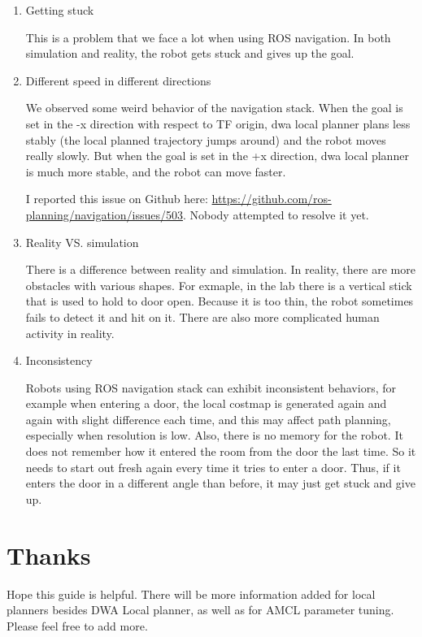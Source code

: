 \documentclass[12pt]{article}
\begin{document}
\begin{enumerate}
\item Getting stuck

This is a problem that we face a lot when using ROS navigation. In both simulation and reality, the robot gets stuck and gives up the goal. 

\item Different speed in different directions

We observed some weird behavior of the navigation stack. When the goal is set in the -x direction with respect to TF origin, dwa local planner plans less stably (the local planned trajectory jumps around) and the robot moves really slowly. But when the goal is set in the +x direction, dwa local planner is much more stable, and the robot can move faster.

I reported this issue on Github here: \url{https://github.com/ros-planning/navigation/issues/503}. Nobody attempted to resolve it yet.

\item Reality VS. simulation

There is a difference between reality and simulation. In reality, there are more obstacles with various shapes. For exmaple, in the lab there is a vertical stick that is used to hold to door
open. Because it is too thin, the robot sometimes fails to detect it and hit on it. There are also more complicated human activity in reality.

\item Inconsistency

Robots using ROS navigation stack can exhibit inconsistent behaviors, for example when entering a door, the local costmap is generated again and again with slight difference each time, and this may affect path planning, especially when resolution is low. Also, there is no memory for the robot. It does not remember how it entered the room from the door the last time. So it needs to start out fresh again every time it tries to enter a door. Thus, if it enters the door in a different angle than before, it may just get stuck and give up.

\end{enumerate}


\section*{Thanks}

Hope this guide is helpful. There will be more information added for local planners besides DWA Local planner, as well as for AMCL parameter tuning. Please feel free to add more.
\end{document}
